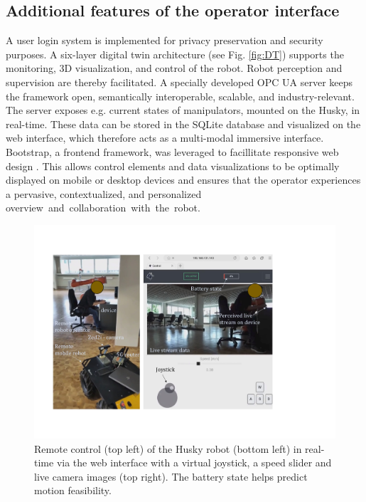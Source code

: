 \documentclass[letterpaper, 10 pt, conference]{ieeeconf}  %
\begin{document}
\subsection{Additional features of the operator interface }
A user login system is implemented for privacy preservation  and security purposes. A six-layer digital twin architecture (see Fig. \ref{fig:DT}) supports the monitoring, 3D visualization, and control of the robot. Robot perception and supervision are thereby facilitated. 
A specially developed OPC UA server keeps the framework open, semantically interoperable, scalable, and industry-relevant. The server exposes e.g. current states of manipulators, mounted on the Husky, in real-time. These data can be stored in the SQLite database and visualized on the web interface, which therefore acts as a multi-modal immersive interface. Bootstrap, a frontend framework, was leveraged to facillitate responsive web design \cite{bootstrap}. 
This allows control elements and data visualizations to be optimally displayed on mobile or desktop devices and ensures that the operator experiences a pervasive, contextualized, and personalized \mbox{overview and collaboration with the robot.}

\begin{figure}[t]
	\vspace{0.2cm}
	\centerline{\includegraphics[height=0.7\columnwidth]{images/telehusky.pdf}}
	\caption{Remote control (top left) of the Husky robot (bottom left) in real-time via the web interface with a virtual joystick, a speed slider and  live camera images (top right). The battery state helps predict motion feasibility.}
	\label{fig:clip}
\end{figure}
\end{document}
